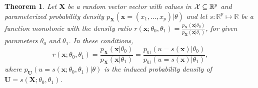 \documentclass[12pt]{article}
\newcommand{\sstar}{s^*}
\numberwithin{equation}{section}
\theoremstyle{plain}
\newtheorem{theorem}{Theorem}
\begin{document}
%
%

\begin{theorem}
    \label{thm:ratio-equivalence}
    Let $\mathbf{X}$ be a random vector vector with values in ${\cal X} \subseteq \mathbb{R}^p$ and parameterized probability
    density $p_{\mathbf{X}}(\mathbf{x} = (x_1, ..., x_p)|\theta)$ and let
    $s : \mathbb{R}^p \mapsto \mathbb{R}$ be a function monotonic with the density ratio
    $r(\mathbf{x};\theta_0,\theta_1) = \frac{p_\mathbf{X}(\mathbf{x}|\theta_0)}{p_\mathbf{X}(\mathbf{x}|\theta_1)}$,
    for given parameters $\theta_0$ and $\theta_1$. In these conditions,
    \begin{equation}
        r(\mathbf{x};\theta_0,\theta_1) = \frac{p_\mathbf{X}(\mathbf{x}|\theta_0)}{p_\mathbf{X}(\mathbf{x}|\theta_1)} = \frac{p_\mathbf{U}(u=s(\mathbf{x})|\theta_0)}{p_\mathbf{U}(u=s(\mathbf{x})|\theta_1)},
    \end{equation}
    where $p_\mathbf{U}(u=s(\mathbf{x};\theta_0,\theta_1)|\theta)$ is the induced probability density of
    $\mathbf{U} = s(\mathbf{X};\theta_0,\theta_1)$.
\end{theorem}
\end{document}
